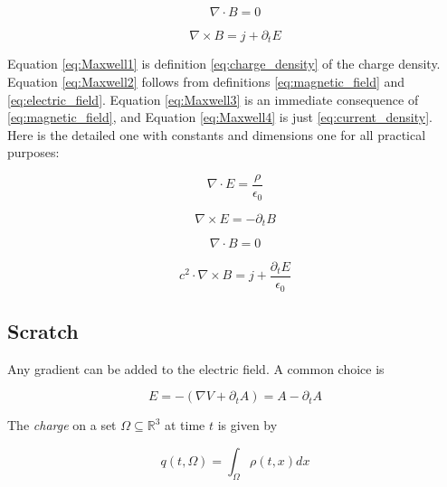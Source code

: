 \documentclass{article}
\begin{document}
\begin{equation}
\label{eq:Maxwell3}
\nabla \cdot B = 0
\end{equation}

\begin{equation}
\label{eq:Maxwell4}
\nabla \times B = j + \partial_t E
\end{equation}


Equation \ref{eq:Maxwell1} is definition \ref{eq:charge_density} of the charge density. Equation \ref{eq:Maxwell2} follows from definitions \ref{eq:magnetic_field} and \ref{eq:electric_field}.
Equation \ref{eq:Maxwell3} is an immediate consequence of \ref{eq:magnetic_field}, and Equation \ref{eq:Maxwell4} is just \ref{eq:current_density}. \\

Here is the detailed one with constants and dimensions one for all practical purposes:

\begin{equation}
\label{eqn:M1c}
\nabla \cdot E = \frac{\rho}{\epsilon_0}
\end{equation}

\begin{equation}
\label{eqn:M2c}
\nabla \times E = - \partial_t B
\end{equation}

\begin{equation}
\label{eqn:M3c}
\nabla \cdot B = 0
\end{equation}

\begin{equation}
\label{eqn:M4c}
c^2 \cdot \nabla \times B = j + \frac{\partial_t E}{\epsilon_0}
\end{equation}


\subsection{Scratch}

Any gradient can be added to the electric field. 
A common choice is

\begin{equation}
E = - (\nabla V + \partial_t A)   = A - \partial_t A
\end{equation}

The \emph{charge} on a set \(\Omega \subseteq \mathbb{R}^3\) at time $t$ is given by

\begin{equation}
q(t, \Omega) = \int_{\Omega} \rho(t, x) dx
\end{equation}
\end{document}
